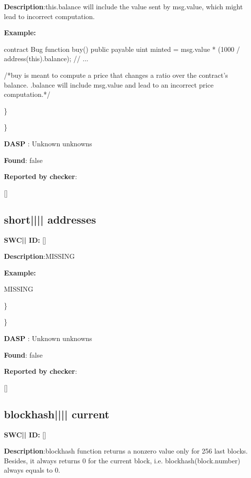 \documentclass{article}
\begin{document}
\textbf{Description}:this.balance will include the value sent by msg.value, which might lead to incorrect computation.


\textbf{Example:} 
\begin{ffcode} 

contract Bug{
  function buy() public payable{
    uint minted = msg.value * (1000 / address(this).balance);
    // ...
  }
}

 /*buy is meant to compute a price that changes a ratio over the contract's balance. .balance will include msg.value and lead to an incorrect price computation.*/ 

\end{ffcode} 
\} 

\} 

\textbf{DASP} : Unknown unknowns

\textbf{Found}: false

\textbf{Reported by checker}: 
\begin{ffcode} 

[]
\end{ffcode} 
\subsection{short{||\textunderscore|| }addresses} 
\textbf{SWC{|\textunderscore| }ID:} []

\textbf{Description}:MISSING


\textbf{Example:} 
\begin{ffcode} 

MISSING

\end{ffcode} 
\} 

\} 

\textbf{DASP} : Unknown unknowns

\textbf{Found}: false

\textbf{Reported by checker}: 
\begin{ffcode} 

[]
\end{ffcode} 
\subsection{blockhash{||\textunderscore|| }current} 
\textbf{SWC{|\textunderscore| }ID:} []

\textbf{Description}:blockhash function returns a non{\textendash}zero value only for 256 last blocks. Besides, it always returns 0 for the current block, i.e. blockhash(block.number) always equals to 0.
\end{document}
